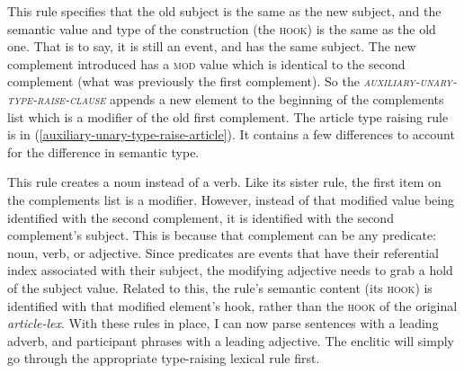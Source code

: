 This rule specifies that the old subject is the same as the new subject, and the semantic value and type of the construction (the \textsc{hook}) is the same as the old one. That is to say, it is still an event, and has the same subject. The new complement introduced has a \textsc{mod} value which is identical to the second complement (what was previously the first complement). So the \textsc{\textit{auxiliary-unary-type-raise-clause}} appends a new element to the beginning of the complements list which is a modifier of the old first complement. The article type raising rule is in (\ref{auxiliary-unary-type-raise-article}). It contains a few differences to account for the difference in semantic type.

\ex \label{auxiliary-unary-type-raise-article}
\xe

This rule creates a noun instead of a verb. Like its sister rule, the first item on the complements list is a modifier. However, instead of that modified value being identified with the second complement, it is identified with the second complement's subject. This is because that complement can be any predicate: noun, verb, or adjective. Since predicates are events that have their referential index associated with their subject, the modifying adjective needs to grab a hold of the subject value. Related to this, the rule's semantic content (its \textsc{hook}) is identified with that modified element's hook, rather than the \textsc{hook} of the original \textit{article-lex}. With these rules in place, I can now parse sentences with a leading adverb, and participant phrases with a leading adjective. The enclitic will simply go through the appropriate type-raising lexical rule first.

